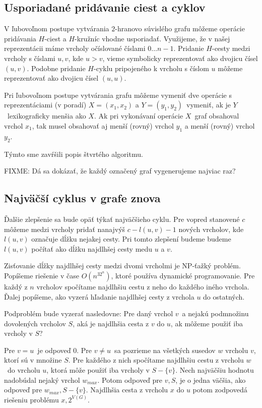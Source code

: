 \subsection{Usporiadané pridávanie ciest a cyklov}

V ľubovoľnom postupe vytvárania $2$-hranovo súvislého grafu môžeme operácie pridávania $H$-ciest
a $H$-kružníc vhodne usporiadať. Využijeme, že v našej reprezentácii máme vrcholy očíslované
číslami $0 \ldots n-1$. Pridanie $H$-cesty medzi vrcholy s číslami $u, v$, kde $u > v$, vieme symbolicky
reprezentovať ako dvojicu čísel $(u,v)$. Podobne pridanie $H$-cyklu pripojeného k vrcholu s číslom $u$
môžeme reprezentovať ako dvojicu čísel $(u,u)$.

Pri ľubovoľnom postupe vytvárania grafu môžeme vymeniť dve operácie s reprezentáciami (v poradí)
$X = (x_1,x_2)$ a $Y = (y_1, y_2)$ vymeniť, ak je $Y$ lexikograficky menšia ako $X$. Ak pri
vykonávaní operácie $X$ graf obsahoval vrchol $x_1$, tak musel obsahovať aj menší (rovný) vrchol $y_1$
a menší (rovný) vrchol $y_2$.

Týmto sme zavŕšili popis štvrtého algoritmu.

FIXME: Dá sa dokázať, že každý označený graf vygenerujeme najviac raz?

\subsection{Najväčší cyklus v grafe znova}

Ďalšie zlepšenie sa bude opäť týkať najväčšieho cyklu. Pre vopred stanovené $c$ môžeme medzi vrcholy
pridať nanajvýš $c - l(u,v) - 1$ nových vrcholov, kde $l(u,v)$ označuje dĺžku nejakej cesty. Pri
tomto zlepšení budeme budeme $l(u,v)$ počítať ako dĺžku najdlhšej cesty medu $u$ a $v$.

Zisťovanie dĺžky najdlhšej cesty medzi dvomi vrcholmi je NP-ťažký problém. Popíšeme riešenie
v čase $O(n^32^n)$, ktoré používa dynamické programovanie. Pre každý z $n$ vrcholov spočítame
najdlhšiu cestu z neho do každého iného vrchola. Ďalej popíšeme, ako vyzerá hľadanie najdlhšej
cesty z vrchola $u$ do ostatných.

Podproblém bude vyzerať nasledovne: Pre daný vrchol $v$ a nejakú podmnožinu dovolených
vrcholov $S$, aká je najdlhšia cesta z $v$ do $u$, ak môžeme použiť iba vrcholy v $S$?

Pre $v = u$ je odpoveď $0$. Pre $v \neq u$ sa pozrieme na všetkých susedov $w$ vrcholu $v$,
ktorí sú v množine $S$. Pre každého z nich spočítame najdlhšiu cestu z vrcholu $w$ do vrcholu
$u$, ktorá môže použiť iba vrcholy v $S - \{v\}$. Nech najväčšiu hodnotu nadobúdal nejaký vrchol
$w_{max}$. Potom odpoveď pre $v, S$, je o jedna väčšia, ako odpoveď pre $w_{max}, S - \{v\}$.
Najdlhšia cesta z vrcholu $x$ do $u$ potom zodpovedá riešeniu problému $x, 2^{V(G)}$.

